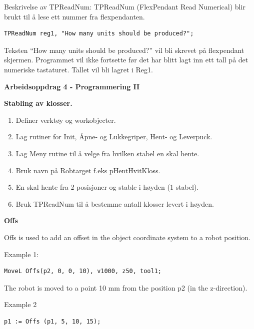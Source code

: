 \begin{enumerate}
Beskrivelse av TPReadNum: TPReadNum (FlexPendant Read Numerical) blir
brukt til å lese ett nummer fra flexpendanten.

\begin{lstlisting}[basicstyle={\sffamily}]
TPReadNum reg1, "How many units should be produced?";
\end{lstlisting}

Teksten \textquotedblleft How many units should be produced?\textquotedblright{}
vil bli skrevet på flexpendant skjermen. Programmet vil ikke fortsette
før det har blitt lagt inn ett tall på det numeriske tastaturet. Tallet
vil bli lagret i Reg1.
\end{enumerate}

\textbf{Arbeidsoppdrag 4 - Programmering II}

\textbf{Stabling av klosser.}
\begin{enumerate}
\item Definer verktøy og workobjecter. 
\item Lag rutiner for Init, Åpne- og Lukkegriper, Hent- og Leverpuck. 
\item Lag Meny rutine til å velge fra hvilken stabel en skal hente. 
\item Bruk navn på Robtarget f.eks pHentHvitKloss. 
\item En skal hente fra 2 posisjoner og stable i høyden (1 stabel). 
\item Bruk TPReadNum til å bestemme antall klosser levert i høyden.
\end{enumerate}

\textbf{Offs}

Offs is used to add an offset in the object coordinate system to a
robot position.

Example 1:

\begin{lstlisting}[basicstyle={\sffamily}]
MoveL Offs(p2, 0, 0, 10), v1000, z50, tool1;
\end{lstlisting}

The robot is moved to a point 10 mm from the position p2 (in the z-direction).

Example 2

\begin{lstlisting}[basicstyle={\sffamily}]
p1 := Offs (p1, 5, 10, 15);
\end{lstlisting}

